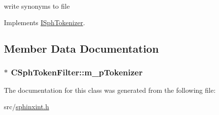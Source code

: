 write synonyms to file 



Implements \hyperlink{classISphTokenizer_af5b14e86d535494f3d9fd0d3110788d4}{I\-Sph\-Tokenizer}.



\subsection{Member Data Documentation}
\hypertarget{classCSphTokenFilter_ac0019c6fdcd1611df4119865f596038b}{
\subsubsection[{m\-\_\-p\-Tokenizer}]{$\ast$ C\-Sph\-Token\-Filter\-::m\-\_\-p\-Tokenizer\hspace{0.3cm}{\ttfamily [protected]}}}\label{classCSphTokenFilter_ac0019c6fdcd1611df4119865f596038b}


The documentation for this class was generated from the following file\-:\begin{DoxyCompactItemize}
\item 
src/\hyperlink{sphinxint_8h}{sphinxint.\-h}\end{DoxyCompactItemize}
